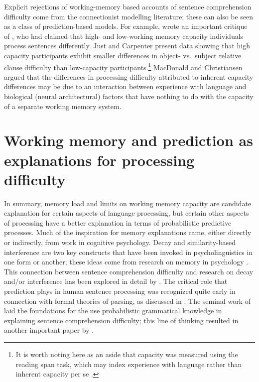\documentclass{cambridge7A}\usepackage[]{graphicx}\usepackage[]{color}
\begin{document}
Explicit rejections of working-memory based accounts of sentence comprehension difficulty come from the connectionist modelling literature; these can also be seen as a class of prediction-based models.
For example, \cite{MacDonaldChristiansen2002} wrote an important critique of \cite{JustCarpenter1992}, who had claimed that high- and low-working memory capacity individuals process sentences differently. Just and Carpenter present data showing that high capacity  participants exhibit smaller differences in object- vs.\ subject relative clause difficulty than 
low-capacity participants.\footnote{It is worth noting here as an aside that capacity was measured using the \cite{DanemanCarpenter1980} reading span task, which may index experience with language rather than inherent capacity per se \citep{wellsetal}.} MacDonald and Christiansen argued that the differences in processing difficulty attributed to inherent  
capacity differences may be due to an interaction between experience with language and biological (neural architectural) factors that have nothing to do with the capacity of a separate working memory system.

\section[Working memory and prediction]{Working memory and prediction as explanations for processing difficulty}

 
In summary,  memory load and limits on working memory capacity are candidate explanation for certain aspects of language processing, but certain other aspects of processing have a better explanation in terms of probabilistic predictive processes.  Much of the inspiration for memory
explanations came, either directly or indirectly, from work in cognitive psychology. Decay and 
similarity-based interference are two key     
constructs that have been invoked in psycholinguistics in one form or another;  these ideas come from research on memory in psychology \citep{brown,petersonpeterson,keppelunderwood,waughnorman}. This 
connection between sentence comprehension difficulty and research on
decay and/or interference has been explored in detail by
\cite{lewis:magical,lewis:phd,Gibson2000,JustCarpenter1992}. The critical role that prediction plays in human sentence processing was recognized quite early in connection with formal  theories of parsing, as discussed in \cite{philip92leftcorner}. The seminal work of \cite{Jurafsky1996} laid the foundations for the use probabilistic grammatical knowledge in explaining sentence comprehension difficulty; this line of thinking  resulted in another important paper by \cite{Levy2008}. 
\end{document}
